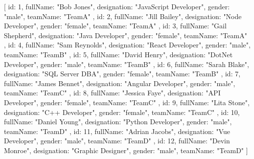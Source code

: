 [ 
    {
        id: 1,
        fullName: "Bob Jones",
        designation: "JavaScript Developer",
        gender: "male",
        teamName: "TeamA"
      },
      {
        id: 2,
        fullName: "Jill Bailey",
        designation: "Node Developer",
        gender: "female",
        teamName: "TeamA"
      },
      {
        id: 3,
        fullName: "Gail Shepherd",
        designation: "Java Developer",
        gender: "female",
        teamName: "TeamA"
      },
      {
        id: 4,
        fullName: "Sam Reynolds",
        designation: "React Developer",
        gender: "male",
        teamName: "TeamB"
      },
      {
        id: 5,
        fullName: "David Henry",
        designation: "DotNet Developer",
        gender: "male",
        teamName: "TeamB"
      },
      {
        id: 6,
        fullName: "Sarah Blake",
        designation: "SQL Server DBA",
        gender: "female",
        teamName: "TeamB"
      },
      {
        id: 7,
        fullName: "James Bennet",
        designation: "Angular Developer",
        gender: "male",
        teamName: "TeamC"
      },
      {
        id: 8,
        fullName: "Jessica Faye",
        designation: "API Developer",
        gender: "female",
        teamName: "TeamC"
      },
      {
        id: 9,
        fullName: "Lita Stone",
        designation: "C++ Developer",
        gender: "female",
        teamName: "TeamC"
      },
      {
        id: 10,
        fullName: "Daniel Young",
        designation: "Python Developer",
        gender: "male",
        teamName: "TeamD"
      },
      {
        id: 11,
        fullName: "Adrian Jacobs",
        designation: "Vue Developer",
        gender: "male",
        teamName: "TeamD"
      },
      {
        id: 12,
        fullName: "Devin Monroe",
        designation: "Graphic Designer",
        gender: "male",
        teamName: "TeamD"
      }
]
